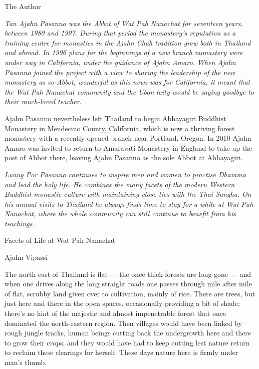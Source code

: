 The Author

\emph{Tan Ajahn Pasanno was the Abbot of Wat Pah Nanachat for seventeen
years, between 1980 and 1997. During that period the monastery's
reputation as a training centre for monastics in the Ajahn Chah
tradition grew both in Thailand and abroad. In 1996 plans for the
beginnings of a new branch monastery were under way in California, under
the guidance of Ajahn Amaro. When Ajahn Pasanno joined the project with
a view to sharing the leadership of the new monastery as co-Abbot,
wonderful as this news was for California, it meant that the Wat Pah
Nanachat community and the Ubon laity would be saying goodbye to their
much-loved teacher.}

Ajahn Pasanno nevertheless left Thailand to begin Abhayagiri Buddhist
Monastery in Mendecino County, California, which is now a thriving
forest monastery with a recently-opened branch near Portland, Oregon. In
2010 Ajahn Amaro was invited to return to Amaravati Monastery in England
to take up the post of Abbot there, leaving Ajahn Pasanno as the sole
Abbot at Abhayagiri.

\emph{Luang Por Pasanno continues to inspire men and women to practise
Dhamma and lead the holy life. He combines the many facets of the modern
Western Buddhist monastic culture with maintaining close ties with the
Thai Sangha. On his annual visits to Thailand he always finds time to
stay for a while at Wat Pah Nanachat, where the whole community can
still continue to benefit from his teachings.}

Facets of Life at Wat Pah Nanachat

Ajahn Vipassi

The north-east of Thailand is flat --- the once thick forests are long
gone --- and when one drives along the long straight roads one passes
through mile after mile of flat, scrubby land given over to cultivation,
mainly of rice. There are trees, but just here and there in the open
spaces, occasionally providing a bit of shade; there's no hint of the
majestic and almost impenetrable forest that once dominated the
north-eastern region. Then villages would have been linked by rough
jungle tracks, human beings cutting back the undergrowth here and there
to grow their crops; and they would have had to keep cutting lest nature
return to reclaim these clearings for herself. These days nature here is
firmly under man's thumb.

